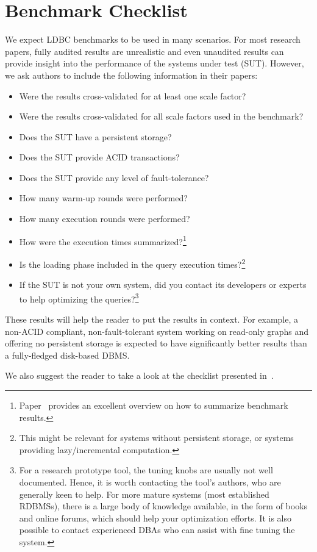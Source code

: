 \chapter{Benchmark Checklist}
\label{sec:benchmark-checklist}

We expect LDBC benchmarks to be used in many scenarios.
For most research papers, fully audited results are unrealistic and even unaudited results can provide insight into the performance of the systems under test (SUT). However, we ask authors to include the following information in their papers:

\begin{itemize}
\item Were the results cross-validated for at least one scale factor?
\item Were the results cross-validated for all scale factors used in the benchmark?
\item Does the SUT have a persistent storage?
\item Does the SUT provide ACID transactions?
\item Does the SUT provide any level of fault-tolerance?
\item How many warm-up rounds were performed?
\item How many execution rounds were performed?
\item How were the execution times summarized?\footnote{Paper~\cite{DBLP:conf/sc/HoeflerB15} provides an excellent overview on how to summarize benchmark results.}
\item Is the loading phase included in the query execution times?\footnote{This might be relevant for systems without persistent storage, or systems providing lazy/incremental computation.}
\item If the SUT is not your own system, did you contact its developers or experts to help optimizing the queries?\footnote{For a research prototype tool, the tuning knobs are usually not well documented. Hence, it is worth contacting the tool's authors, who are generally keen to help. For more mature systems (\eg most established RDBMSs), there is a large body of knowledge available, in the form of books and online forums, which should help your optimization efforts. It is also possible to contact experienced DBAs who can assist with fine tuning the system.}
\end{itemize}

These results will help the reader to put the results in context. For example, a non-ACID compliant, non-fault-tolerant system working on read-only graphs and offering no persistent storage is expected to have significantly better results than a fully-fledged disk-based DBMS.

We also suggest the reader to take a look at the checklist presented in~\cite{DBLP:conf/sigmod/RaasveldtHGM18}.
